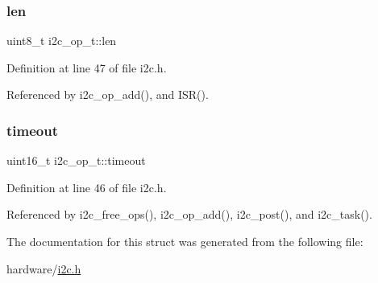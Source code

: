 \subsubsection{\texorpdfstring{len}{len}}
{\footnotesize\ttfamily uint8\+\_\+t i2c\+\_\+op\+\_\+t\+::len}



Definition at line 47 of file i2c.\+h.



Referenced by i2c\+\_\+op\+\_\+add(), and I\+S\+R().

\mbox{\label{structi2c__op__t_a1b20cc2c470b03ecc097a1cd792bbffb}} 
\subsubsection{\texorpdfstring{timeout}{timeout}}
{\footnotesize\ttfamily uint16\+\_\+t i2c\+\_\+op\+\_\+t\+::timeout}



Definition at line 46 of file i2c.\+h.



Referenced by i2c\+\_\+free\+\_\+ops(), i2c\+\_\+op\+\_\+add(), i2c\+\_\+post(), and i2c\+\_\+task().



The documentation for this struct was generated from the following file\+:\begin{DoxyCompactItemize}
\item 
hardware/\hyperlink{i2c_8h}{i2c.\+h}\end{DoxyCompactItemize}

